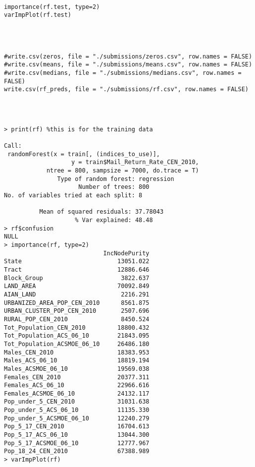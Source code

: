 \documentclass[journal]{/home/hoofar/LatexClasses/IEEEtran}
\begin{document}
\begin{verbatim}




\end{verbatim}
\newpage
\begin{verbatim}

importance(rf.test, type=2)
varImpPlot(rf.test)
 



#write.csv(zeros, file = "./submissions/zeros.csv", row.names = FALSE)
#write.csv(means, file = "./submissions/means.csv", row.names = FALSE)
#write.csv(medians, file = "./submissions/medians.csv", row.names = FALSE)
write.csv(rf_preds, file = "./submissions/rf.csv", row.names = FALSE)



\end{verbatim}

\begin{verbatim}

> print(rf) %this is for the training data

Call:
 randomForest(x = train[, (indices_to_use)], 
 				   y = train$Mail_Return_Rate_CEN_2010,      
 			ntree = 800, sampsize = 7000, do.trace = T) 
               Type of random forest: regression
                     Number of trees: 800
No. of variables tried at each split: 8

          Mean of squared residuals: 37.78043
                    % Var explained: 48.48
> rf$confusion
NULL
> importance(rf, type=2)
                            IncNodePurity
State                           13051.022
Tract                           12886.646
Block_Group                      3822.637
LAND_AREA                       70092.849
AIAN_LAND                        2216.291
URBANIZED_AREA_POP_CEN_2010      8561.875
URBAN_CLUSTER_POP_CEN_2010       2507.696
RURAL_POP_CEN_2010               8450.524
Tot_Population_CEN_2010         18800.432
Tot_Population_ACS_06_10        21843.095
Tot_Population_ACSMOE_06_10     26486.180
Males_CEN_2010                  18383.953
Males_ACS_06_10                 18819.194
Males_ACSMOE_06_10              19569.038
Females_CEN_2010                20377.311
Females_ACS_06_10               22966.616
Females_ACSMOE_06_10            24132.117
Pop_under_5_CEN_2010            31031.638
Pop_under_5_ACS_06_10           11135.330
Pop_under_5_ACSMOE_06_10        12240.279
Pop_5_17_CEN_2010               16704.613
Pop_5_17_ACS_06_10              13044.300
Pop_5_17_ACSMOE_06_10           12777.967
Pop_18_24_CEN_2010              67388.989
> varImpPlot(rf)

\end{verbatim}
\begin{verbatim}

\end{verbatim}
%
\end{document}
